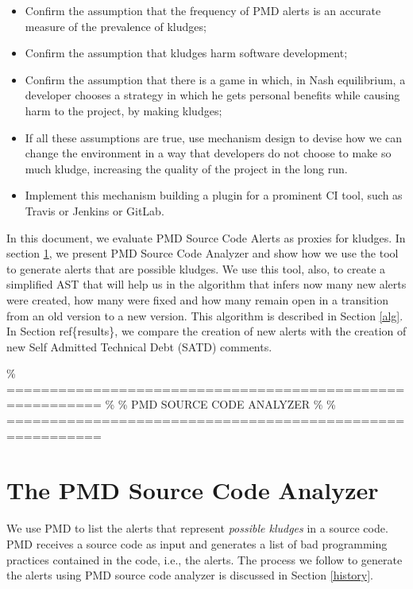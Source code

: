 \documentclass[
]{article}
\begin{document}
\begin{itemize}
\item
  Confirm the assumption that the frequency of PMD alerts is an accurate
  measure of the prevalence of kludges;
  
\item
  Confirm the assumption that kludges harm software development;

\item
  Confirm the assumption that there is a game in which, in Nash
  equilibrium, a developer chooses a strategy in which he gets personal
  benefits while causing harm to the project, by making kludges;

\item
  If all these assumptions are true, use mechanism design to devise how
  we can change the environment in a way that developers do not choose
  to make so much kludge, increasing the quality of the project in the
  long run.

\item
  Implement this mechanism building a plugin for a prominent CI tool,
  such as Travis or Jenkins or GitLab.
\end{itemize}

In this document, we evaluate PMD Source Code Alerts as proxies for
kludges. In section \ref{pmd}, we present PMD Source Code Analyzer and
show how we use the tool to generate alerts that are possible kludges.
We use this tool, also, to create a simplified AST that will help us in
the algorithm that infers now many new alerts were created, how many
were fixed and how many remain open in a transition from an old version
to a new version. This algorithm is described in Section \ref{alg}. In
Section ref\{results\}, we compare the creation of new alerts with the
creation of new Self Admitted Technical Debt (SATD) comments.

\% ========================================================= \% \% PMD
SOURCE CODE ANALYZER \% \%
=========================================================

\section{The PMD Source Code Analyzer}\label{pmd}

We use PMD to list the alerts that represent \textit{possible kludges}
in a source code. PMD receives a source code as input and generates a
list of bad programming practices contained in the code, i.e., the
alerts. The process we follow to generate the alerts using PMD source
code analyzer is discussed in Section \ref{history}.
\end{document}
